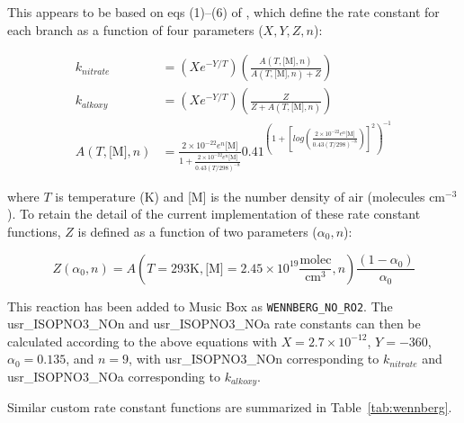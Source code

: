 \documentclass[titlepage]{article}
\begin{document}
This appears to be based on eqs (1)--(6) of \cite{Wennberg2018}, which define the rate constant for each branch as a function of four parameters ($X, Y, Z, n$):

\begin{equation}
\begin{split}
k_{nitrate} & = \left(X e^{-Y/T}\right) \left(\frac{A(T, \mbox{[M]}, n)}{A(T, \mbox{[M]}, n) + Z}\right) \\
k_{alkoxy} & = \left(X e^{-Y/T}\right)\left(\frac{Z}{Z + A(T, \mbox{[M]}, n)}\right) \\
A(T, \mbox{[M]}, n) & = \frac{2 \times 10^{-22} e^n \mbox{[M]}}{1 + \frac{2 \times 10^{-22} e^n \mbox{[M]}}{0.43(T/298)^{-8}}} 0.41^{(1+[log( \frac{2 \times 10^{-22} e^n \mbox{[M]}}{0.43(T/298)^{-8}})]^2)^{-1}}
\end{split}
\end{equation}

\noindent where $T$ is temperature (K) and [M] is the number density of air (molecules $\mbox{cm}^{-3}$).
To retain the detail of the current implementation of these rate constant functions, $Z$ is defined as a function of two parameters ($\alpha_0, n$):

\begin{equation}
Z( \alpha_0, n) = A(T = 293 \mbox{K}, \mbox{[M]} = 2.45 \times 10^{19} \frac{\mbox{molec}}{\mbox{cm}^3}, n) \frac{(1-\alpha_0)}{\alpha_0}
\end{equation}

This reaction has been added to Music Box as \verb>WENNBERG_NO_RO2>. The usr\_ISOPNO3\_NOn and usr\_ISOPNO3\_NOa rate constants can then be calculated according to the above equations with $X = 2.7 \times 10^{-12}$, $Y = -360$, $\alpha_0 = 0.135$, and $n = 9$, with usr\_ISOPNO3\_NOn corresponding to $k_{nitrate}$ and usr\_ISOPNO3\_NOa corresponding to $k_{alkoxy}$.

Similar custom rate constant functions are summarized in Table~\ref{tab:wennberg}.
\end{document}
